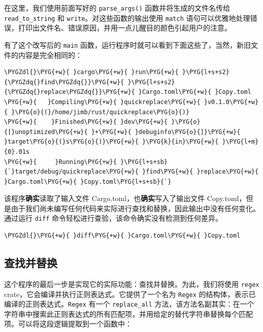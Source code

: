 在这里，我们使用前面写好的 \texttt{parse\_args()} 函数并将生成的文件名传给 \texttt{read\_to\_string} 和 \texttt{write}。对这些函数的输出使用 \texttt{match} 语句可以优雅地处理错误，打印出文件名、错误原因，并用一点儿醒目的颜色引起用户的注意。

有了这个改写后的 \texttt{main} 函数，运行程序时就可以看到下面这些了，当然，新旧文件的内容是完全相同的：

\begin{Verbatim}[commandchars=\\\{\},breaklines=true,breakanywhere=true,fontsize=\codefont,xleftmargin=17bp]
\PYGZdl{}\PYG{+w}{ }cargo\PYG{+w}{ }run\PYG{+w}{ }\PYG{l+s+s2}{\PYGZdq{}find\PYGZdq{}}\PYG{+w}{ }\PYG{l+s+s2}{\PYGZdq{}replace\PYGZdq{}}\PYG{+w}{ }Cargo.toml\PYG{+w}{ }Copy.toml
\PYG{+w}{   }Compiling\PYG{+w}{ }quickreplace\PYG{+w}{ }v0.1.0\PYG{+w}{ }\PYG{o}{(}/home/jimb/rust/quickreplace\PYG{o}{)}
\PYG{+w}{    }Finished\PYG{+w}{ }dev\PYG{+w}{ }\PYG{o}{[}unoptimized\PYG{+w}{ }+\PYG{+w}{ }debuginfo\PYG{o}{]}\PYG{+w}{ }target\PYG{o}{(}s\PYG{o}{)}\PYG{+w}{ }\PYG{k}{in}\PYG{+w}{ }\PYG{l+m}{0}.01s
\PYG{+w}{     }Running\PYG{+w}{ }\PYG{l+s+sb}{`}target/debug/quickreplace\PYG{+w}{ }find\PYG{+w}{ }replace\PYG{+w}{ }Cargo.toml\PYG{+w}{ }Copy.toml\PYG{l+s+sb}{`}
\end{Verbatim}

该程序\textbf{确实}读取了输入文件 Cargo.toml，也\textbf{确实}写入了输出文件 Copy.toml，但是由于我们尚未编写任何代码来实际进行查找和替换，因此输出中没有任何变化。通过运行 \texttt{diff} 命令轻松进行查验，该命令确实没有检测到任何差异。

\begin{Verbatim}[commandchars=\\\{\},breaklines=true,breakanywhere=true,fontsize=\codefont,xleftmargin=17bp]
\PYGZdl{}\PYG{+w}{ }diff\PYG{+w}{ }Cargo.toml\PYG{+w}{ }Copy.toml
\end{Verbatim}

\subsection{查找并替换}

这个程序的最后一步是实现它的实际功能：查找并替换。为此，我们将使用 \texttt{regex} crate，它会编译并执行正则表达式。它提供了一个名为 \texttt{Regex} 的结构体，表示已编译的正则表达式。\texttt{Regex} 有一个 \texttt{replace\_all} 方法，该方法名副其实：在一个字符串中搜索此正则表达式的所有匹配项，并用给定的替代字符串替换每个匹配项。可以将这段逻辑提取到一个函数中：

